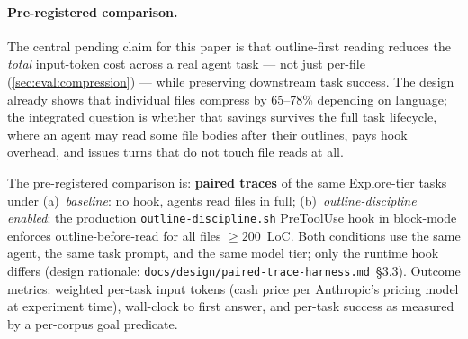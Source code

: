 \newcommand{\headlineDeltaTokens}{$0$ tokens (median); $+1{,}149$ tokens (mean); range $[-15{,}609,\,+22{,}552]$ across $N=55$ paired tasks; sign split $25/26/4$ (ON$>$OFF / ON$<$OFF / tied)}
\newcommand{\headlineDeltaTokensCI}{undefined (BCa degenerate; $4$ of $55$ task pairs tied at $\Delta=0$ collapse the bootstrap variance estimator)}
\newcommand{\successProportionAtLeastZero}{$55/55 = 100\%$ (with caveat in CI macro below)}
\newcommand{\successProportionCI}{$[93.5\%,\,100.0\%]$ Wilson on $N=55$; the predicate-level success channel is valid only for the $N=39$ tasks whose agent final message was captured (all $30$ blackrim and $9$ of $10$ Django); the $10$ FastAPI tasks and $5$ golden-contamination probes lacked their source in the harness sandbox and could not produce a final message string}

\paragraph{Pre-registered comparison.}
The central pending claim for this paper is that outline-first reading
reduces the \emph{total} input-token cost across a real agent task ---
not just per-file (\cref{sec:eval:compression}) --- while preserving
downstream task success.  The design already shows that individual files
compress by 65--78\% depending on language; the integrated question is
whether that savings survives the full task lifecycle, where an agent may
read some file bodies after their outlines, pays hook overhead, and issues
turns that do not touch file reads at all.

The pre-registered comparison is: \textbf{paired traces} of the same
Explore-tier tasks under (a)~\emph{baseline}: no hook, agents read files
in full; (b)~\emph{outline-discipline enabled}: the production
\texttt{outline-discipline.sh} PreToolUse hook in block-mode enforces
outline-before-read for all files $\geq 200$~LoC.  Both conditions use
the same agent, the same task prompt, and the same model tier; only the
runtime hook differs (design rationale:
\texttt{docs/design/paired-trace-harness.md}~\S3.3).
Outcome metrics: weighted per-task input tokens (cash price per
Anthropic's pricing model at experiment time), wall-clock to first
answer, and per-task success as measured by a per-corpus goal predicate.

